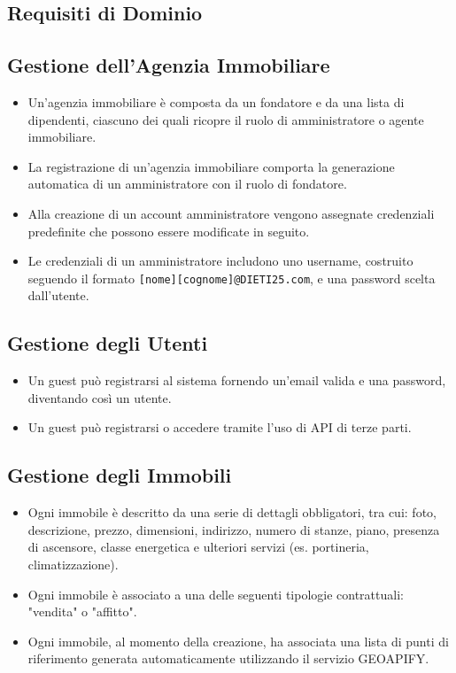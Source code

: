 \subsection{Requisiti di Dominio}

\subsection*{Gestione dell'Agenzia Immobiliare}
\begin{itemize}
    \item [D\textminus A1] Un'agenzia immobiliare è composta da un fondatore e da una lista di dipendenti, ciascuno dei quali ricopre il ruolo di amministratore o agente immobiliare.
    \item [D\textminus A2] La registrazione di un’agenzia immobiliare comporta la generazione automatica di un amministratore con il ruolo di fondatore.
    \item [D\textminus A3] Alla creazione di un account amministratore vengono assegnate credenziali predefinite che possono essere modificate in seguito.
    \item [D\textminus A4] Le credenziali di un amministratore includono uno username, costruito seguendo il formato \texttt{[nome][cognome]@DIETI25.com}, e una password scelta dall’utente.
\end{itemize}

\subsection*{Gestione degli Utenti}
\begin{itemize}
    \item [D\textminus U1] Un guest può registrarsi al sistema fornendo un’email valida e una password, diventando così un utente.
    \item [D\textminus U2] Un guest può registrarsi o accedere tramite l’uso di API di terze parti.
\end{itemize}

\subsection*{Gestione degli Immobili}
\begin{itemize}
    \item [D\textminus G1] Ogni immobile è descritto da una serie di dettagli obbligatori, tra cui: foto, descrizione, prezzo, dimensioni, indirizzo, numero di stanze, piano, presenza di ascensore, classe energetica e ulteriori servizi (es. portineria, climatizzazione).
    \item [D\textminus G2] Ogni immobile è associato a una delle seguenti tipologie contrattuali: "vendita" o "affitto".
    \item [D\textminus G3] Ogni immobile, al momento della creazione, ha associata una lista di punti di riferimento generata automaticamente utilizzando il servizio GEOAPIFY.
\end{itemize}

